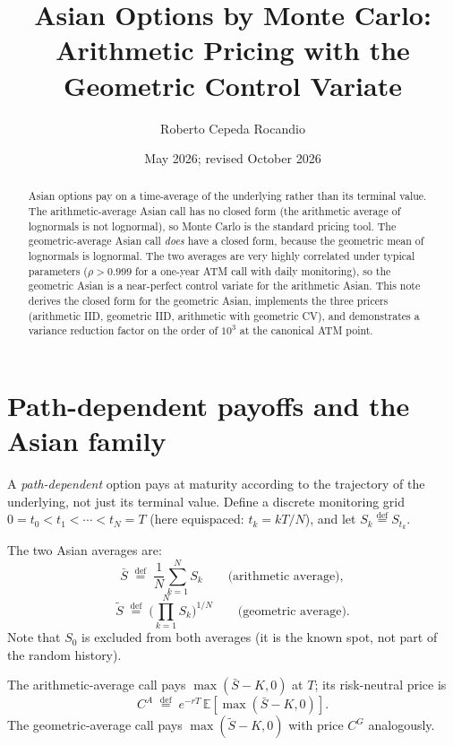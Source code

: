 \documentclass[11pt,a4paper]{article}
\title{Asian Options by Monte Carlo:\\
       Arithmetic Pricing with the Geometric Control Variate}
\author{Roberto Cepeda Rocandio}
\date{May 2026; revised October 2026}
\theoremstyle{plain}
\theoremstyle{definition}
\theoremstyle{remark}
\newcommand{\E}{\mathbb{E}}
\newcommand{\eqdef}{\overset{\mathrm{def}}{=}}
\begin{document}
\maketitle

\begin{abstract}
Asian options pay on a time-average of the underlying rather than
its terminal value. The arithmetic-average Asian call has no closed
form (the arithmetic average of lognormals is not lognormal), so
Monte Carlo is the standard pricing tool. The geometric-average
Asian call \emph{does} have a closed form, because the geometric
mean of lognormals is lognormal. The two averages are very highly
correlated under typical parameters ($\rho > 0.999$ for a one-year
ATM call with daily monitoring), so the geometric Asian is a
near-perfect control variate for the arithmetic Asian. This note
derives the closed form for the geometric Asian, implements the
three pricers (arithmetic IID, geometric IID, arithmetic with
geometric CV), and demonstrates a variance reduction factor on the
order of $10^3$ at the canonical ATM point.
\end{abstract}

\tableofcontents

\section{Path-dependent payoffs and the Asian family}
\label{sec:setting}

A \emph{path-dependent} option pays at maturity according to the
trajectory of the underlying, not just its terminal value. Define
a discrete monitoring grid $0 = t_0 < t_1 < \cdots < t_N = T$
(here equispaced: $t_k = kT/N$), and let $S_k \eqdef S_{t_k}$.

The two Asian averages are:
\begin{equation}
\bar S \;\eqdef\; \frac{1}{N}\sum_{k=1}^N S_k
\qquad\text{(arithmetic average)},
\end{equation}
\begin{equation}
\tilde S \;\eqdef\; \biggl(\prod_{k=1}^N S_k\biggr)^{1/N}
\qquad\text{(geometric average)}.
\end{equation}
Note that $S_0$ is excluded from both averages (it is the known spot,
not part of the random history).

The arithmetic-average call pays $\max(\bar S - K, 0)$ at $T$; its
risk-neutral price is
\begin{equation}
C^A \;\eqdef\; e^{-rT}\,\E[\max(\bar S - K, 0)].
\end{equation}
The geometric-average call pays $\max(\tilde S - K, 0)$ with price
$C^G$ analogously.
\end{document}
